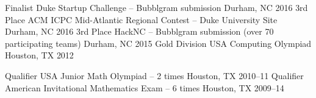 \begin{cvhonors}
  \cvhonor
    {Finalist}
    {Duke Startup Challenge -- Bubblgram submission}
    {Durham, NC}
    {2016}
  \cvhonor
    {3rd Place}
    {ACM ICPC Mid-Atlantic Regional Contest -- Duke University Site}
    {Durham, NC}
    {2016}
  \cvhonor
    {3rd Place}
    {HackNC -- Bubblgram submission (over 70 participating teams)}
    {Durham, NC}
    {2015}
  \cvhonor
    {Gold Division}
    {USA Computing Olympiad}
    {Houston, TX}
    {2012}
\end{cvhonors}

\begin{cvhonors}
  \cvhonor
    {Qualifier}
    {USA Junior Math Olympiad -- 2 times}
    {Houston, TX}
    {2010--11}
  \cvhonor
    {Qualifier}
    {American Invitational Mathematics Exam -- 6 times}
    {Houston, TX}
    {2009--14}
\end{cvhonors}

